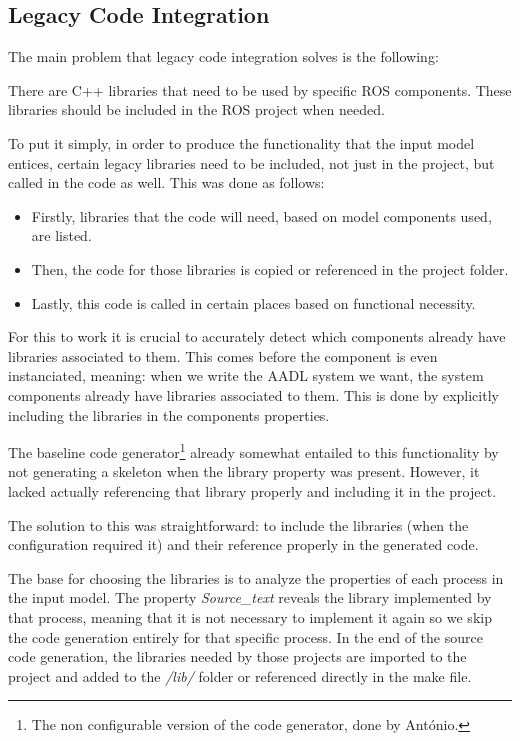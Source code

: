 \newpage

\subsection{Legacy Code Integration}
\label{sec:impl_legacy_code}

The main problem that legacy code integration solves is the following:

There are C++ libraries that need to be used by specific \gls{ROS} components. These libraries should be included in the \gls{ROS} project when needed.

To put it simply, in order to produce the functionality that the input model entices, certain legacy libraries need to be included, not just in the project, but called in the code as well. This was done as follows:

\begin{itemize} 
	\item Firstly, libraries that the code will need, based on model components used, are listed.
	\item Then, the code for those libraries is copied or referenced in the project folder.
	\item Lastly, this code is called in certain places based on functional necessity.
\end{itemize}

For this to work it is crucial to accurately detect which components already have libraries associated to them. This comes before the component is even instanciated, meaning: when we write the \gls{AADL} system we want, the system components already have libraries associated to them. This is done by explicitly including the libraries in the components properties.

The baseline code generator\footnote{The non configurable version of the code generator, done by António.} already somewhat entailed to this functionality by not generating a skeleton when the library property was present. However, it lacked actually referencing that library properly and including it in the project.

The solution to this was straightforward: to include the libraries (when the configuration required it) and their reference properly in the generated code.

The base for choosing the libraries is to analyze the properties of each process in the input model. The property \textit{Source\_text} reveals the library implemented by that process, meaning that it is not necessary to implement it again so we skip the code generation entirely for that specific process. In the end of the source code generation, the libraries needed by those projects are imported to the project and added to the \textit{/lib/} folder or referenced directly in the make file.


